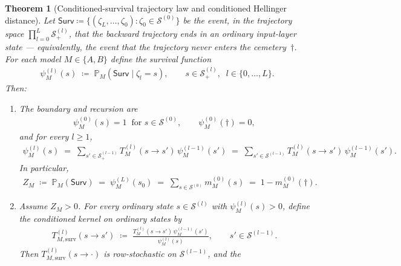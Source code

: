 \documentclass[twoside]{article}
\newcommand{\1}{\mathbf{1}}
\newtheorem{theorem}{Theorem}
\begin{document}
\begin{theorem}[Conditioned-survival trajectory law and conditioned Hellinger distance]\label{thm:conditioned-survival}
Let $\mathsf{Surv} \coloneqq \{(\zeta_L,\ldots,\zeta_0) : \zeta_0 \in \mathcal{S}^{(0)}\}$ be the
event, in the trajectory space $\prod_{l=0}^{L} \mathcal{S}^{(l)}_+$, that the backward trajectory
ends in an ordinary input-layer state — equivalently, the event that the trajectory never enters
the cemetery~$\dagger$.  For each model $M \in \{A,B\}$ define the survival function
\begin{align}\label{eq:survival-function}
    \psi_M^{(l)}(s)
    \;\coloneqq\;
    \mathbb{P}_M(\mathsf{Surv} \mid \zeta_l = s),
    \qquad s \in \mathcal{S}^{(l)}_+, \;\; l \in \{0,\ldots,L\}.
\end{align}
Then:
\begin{enumerate}
    \item[(i)] The boundary and recursion are
        \begin{align}\label{eq:survival-boundary}
            \psi_M^{(0)}(s) = 1 \;\; \text{for } s \in \mathcal{S}^{(0)},
            \qquad
            \psi_M^{(0)}(\dagger) = 0,
        \end{align}
        and for every $l \ge 1$,
        \begin{align}\label{eq:survival-recursion}
            \psi_M^{(l)}(s)
            \;=\;
            \sum_{s' \in \mathcal{S}^{(l-1)}_+} T_M^{(l)}(s \to s')\, \psi_M^{(l-1)}(s')
            \;=\;
            \sum_{s' \in \mathcal{S}^{(l-1)}} T_M^{(l)}(s \to s')\, \psi_M^{(l-1)}(s').
        \end{align}
        In particular,
        \begin{align}\label{eq:survival-mass}
            Z_M \;\coloneqq\; \mathbb{P}_M(\mathsf{Surv}) \;=\; \psi_M^{(L)}(s_0) \;=\; \sum_{s \in
            \mathcal{S}^{(0)}} m_M^{(0)}(s) \;=\; 1 - m_M^{(0)}(\dagger).
        \end{align}
    \item[(ii)] Assume $Z_M > 0$.  For every ordinary state $s \in \mathcal{S}^{(l)}$ with $\psi_M^{(l)}(s) >
            0$, define the conditioned kernel on ordinary states by
        \begin{align}\label{eq:conditioned-kernel}
            T_{M,\mathrm{surv}}^{(l)}(s \to s')
            \;\coloneqq\;
            \frac{T_M^{(l)}(s \to s')\, \psi_M^{(l-1)}(s')}{\psi_M^{(l)}(s)},
            \qquad s' \in \mathcal{S}^{(l-1)}.
        \end{align}
        Then $T_{M,\mathrm{surv}}^{(l)}(s \to \cdot)$ is row-stochastic on $\mathcal{S}^{(l-1)}$, and the

\end{enumerate}
\end{theorem}
\end{document}
